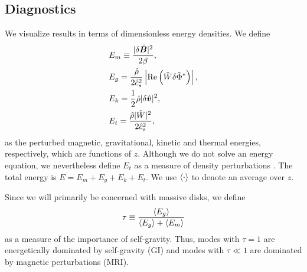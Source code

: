 \subsection{Diagnostics}
We visualize results in terms of dimensionless energy densities. We
define 
\begin{align}
  &E_m \equiv \frac{|\delta \hat{\bm{B}}|^2}{2\beta},\\
  &E_g = 
  \frac{\hat{\rho}}{2\hat{c}_s^2}\left|\operatorname{Re}\left(\hat{W}\delta\hat{\Phi}^*\right)\right|,\\  
  &E_k = \frac{1}{2}\hat{\rho}|\delta\hat{\bm{v}}|^2,\\
  &E_t = \frac{\hat{\rho}|\hat{W}|^2}{2\hat{c}_s^2},
\end{align}
as the perturbed magnetic, gravitational, kinetic and thermal
energies, respectively, which are functions of $z$. Although we do not
solve an energy equation, we nevertheless define $E_t$ as a measure of
density perturbations \citep{kojima89}. The total energy
is $E=E_m+E_g+E_k+E_t$. We use $\langle{\cdot}\rangle$ to denote an average over
$z$. 

Since we will primarily be concerned with massive disks, we define
\begin{align}
  \tau \equiv \frac{\langle{E_g}\rangle}{\langle{E_g}\rangle + \langle{E_m}\rangle} 
\end{align} 
as a measure of the importance of self-gravity. Thus, modes with $\tau
= 1$ are energetically dominated by self-gravity (GI) and modes with
$\tau\ll1$ are dominated by magnetic perturbations (MRI).   


